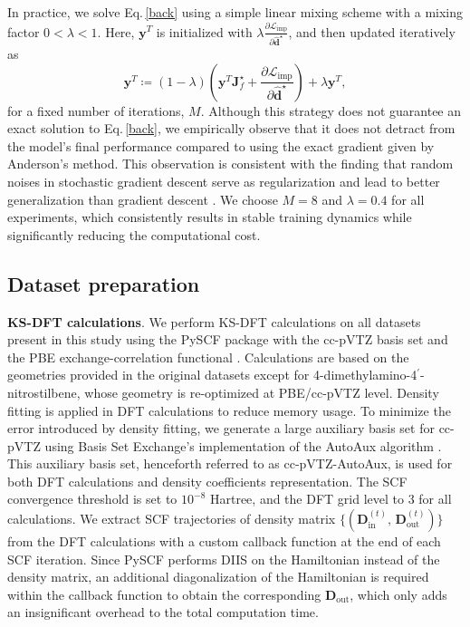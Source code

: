\documentclass[%
reprint,
superscriptaddress,
bibnotes,
amsmath,amssymb,
aps,
floatfix, %
]{revtex4-2}
\begin{document}
In practice, we solve Eq.\,\eqref{back} using a simple linear mixing scheme with a mixing factor $0 < \lambda < 1$. Here, $\mathbf{y}^T$ is initialized with $\lambda \frac{\partial \mathcal{L}_\text{imp}}{\partial \hat{\mathbf{d}}^\star}$, and then updated iteratively as
\begin{equation}
  \mathbf{y}^T \coloneq (1-\lambda) \left(\mathbf{y}^T \mathbf{J}_f^\star + \frac{\partial \mathcal{L}_\text{imp}}{\partial \hat{\mathbf{d}}^\star}\right) + \lambda \mathbf{y}^T,
\end{equation}
for a fixed number of iterations, $M$. Although this strategy does not guarantee an exact solution to Eq.\,\eqref{back}, we empirically observe that it does not detract from the model's final performance compared to using the exact gradient given by Anderson's method. This observation is consistent with the finding that random noises in stochastic gradient descent serve as regularization and lead to better generalization than gradient descent \cite{prince2023understanding}. We choose $M=8$ and $\lambda=0.4$ for all experiments, which consistently results in stable training dynamics while significantly reducing the computational cost.

\subsection{\label{sec:data}Dataset preparation}

\noindent\textbf{KS-DFT calculations}. We perform KS-DFT calculations on all datasets present in this study using the PySCF package \cite{sun2018pyscf} with the cc-pVTZ basis set and the PBE exchange-correlation functional \cite{perdew1996pbe}. Calculations are based on the geometries provided in the original datasets except for 4-dimethylamino-4$^\prime$-nitrostilbene, whose geometry is re-optimized at PBE/cc-pVTZ level. Density fitting is applied in DFT calculations to reduce memory usage. To minimize the error introduced by density fitting, we generate a large auxiliary basis set for cc-pVTZ using Basis Set Exchange's \cite{pritchard2019new} implementation of the AutoAux algorithm \cite{stoychev2017automatic}. This auxiliary basis set, henceforth referred to as cc-pVTZ-AutoAux, is used for both DFT calculations and density coefficients representation. The SCF convergence threshold is set to $10^{-8}$ Hartree, and the DFT grid level to 3 for all calculations. We extract SCF trajectories of density matrix $\{(\mathbf{D}_\text{in}^{(t)}, \,\mathbf{D}_\text{out}^{(t)})\}$ from the DFT calculations with a custom callback function at the end of each SCF iteration. Since PySCF performs DIIS on the Hamiltonian instead of the density matrix, an additional diagonalization of the Hamiltonian is required within the callback function to obtain the corresponding $\mathbf{D}_\text{out}$, which only adds an insignificant overhead to the total computation time.
\end{document}
